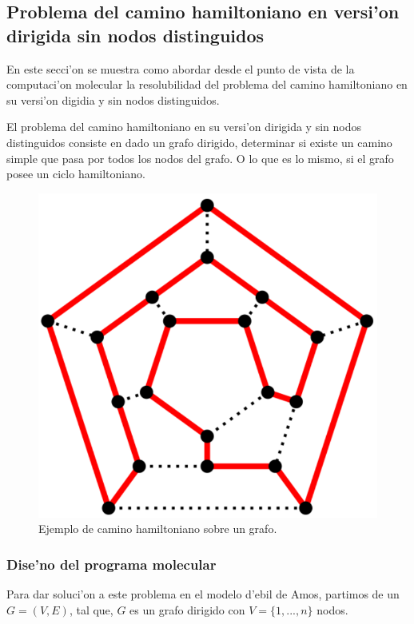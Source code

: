 \documentclass[12pt]{article}
\begin{document}
\subsection{Problema del camino hamiltoniano en versi'on dirigida sin nodos distinguidos}

En este secci'on se muestra como abordar desde el punto de vista de la computaci'on molecular la resolubilidad
del problema del camino hamiltoniano en su versi'on digidia y sin nodos distinguidos.

El problema del camino hamiltoniano en su versi'on dirigida y sin nodos distinguidos consiste en
dado un grafo dirigido, determinar si existe un camino simple que pasa por todos los nodos del grafo. O lo
que es lo mismo, si el grafo posee un ciclo hamiltoniano.

\begin{figure}[h]
\centering
\includegraphics[scale=0.5]{hamiltoniano}
\caption{Ejemplo de camino hamiltoniano sobre un grafo.}
\end{figure}

\subsubsection{Dise'no del programa molecular}

Para dar soluci'on a este problema en el modelo d'ebil de Amos, partimos de un $G = (V,E)$, tal que, $G$ es un grafo
dirigido con $V = \{1,...,n\}$ nodos.
\end{document}
